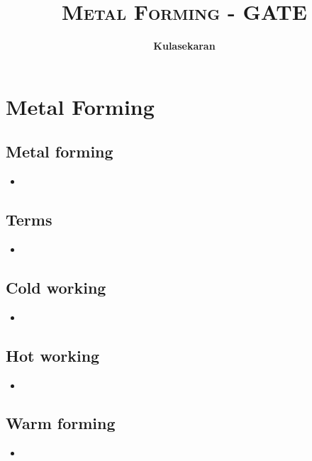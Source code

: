 \documentclass[8pt]{report}
\title{\Huge{\textsc{Metal Forming - GATE}}}
\author{\huge{\textbf{Kulasekaran}}}
\begin{document}
\maketitle
\tableofcontents
\chapter{Metal Forming}
\section{Metal forming}
	\begin{itemize}
		\item
	\end{itemize}\hrulefill
\section{Terms}
	\begin{itemize}
		\item
	\end{itemize}\hrulefill
\section{Cold working}
	\begin{itemize}
		\item
	\end{itemize}\hrulefill
\section{Hot working}
	\begin{itemize}
		\item
	\end{itemize}\hrulefill
\section{Warm forming}
	\begin{itemize}
		\item
	\end{itemize}\hrulefill
\end{document}
